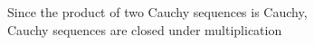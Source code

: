 \documentclass[preview]{standalone}
\begin{document}
\begin{center}
Since the product of two Cauchy sequences is Cauchy,\\Cauchy sequences are closed under multiplication
\end{center}
\end{document}
